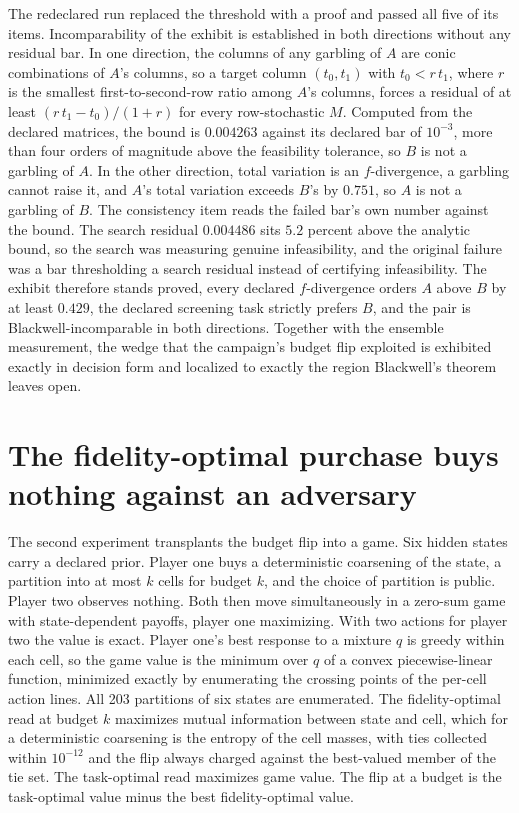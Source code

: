 \documentclass[aps,pre,reprint,nofootinbib]{revtex4-2}
\begin{document}
The redeclared run replaced the threshold with a proof and passed all
five of its items.  Incomparability of the exhibit is established in
both directions without any residual bar.  In one direction, the
columns of any garbling of $A$ are conic
combinations of $A$'s columns, so a target column $(t_0, t_1)$
with $t_0 < r\, t_1$, where $r$ is the smallest first-to-second-row
ratio among $A$'s columns, forces a residual of at least
$(r\, t_1 - t_0)/(1+r)$ for every row-stochastic $M$.  Computed from
the declared matrices, the bound is $0.004263$ against its declared
bar of $10^{-3}$, more than four orders of magnitude above the
feasibility tolerance, so $B$ is not a garbling of $A$.  In the other
direction, total variation is an $f$-divergence, a garbling cannot
raise it, and $A$'s total variation exceeds $B$'s by $0.751$, so $A$
is not a garbling of $B$.  The consistency item reads the failed
bar's own number against the bound.  The search residual $0.004486$
sits $5.2$ percent above the analytic bound, so the search
was measuring genuine infeasibility, and the original failure was a
bar thresholding a search residual instead of certifying
infeasibility.  The exhibit therefore stands proved, every declared
$f$-divergence orders $A$ above $B$ by at least $0.429$, the declared
screening task strictly prefers $B$, and the pair is
Blackwell-incomparable in both directions.  Together with the
ensemble measurement, the wedge that the campaign's budget flip
exploited is exhibited exactly in decision form and localized to
exactly the region Blackwell's theorem leaves open.

\section{The fidelity-optimal purchase buys nothing against an
adversary}
\label{sec:gd2}

The second experiment transplants the budget flip into a game.  Six
hidden states carry a declared prior.  Player one buys a
deterministic coarsening of the state, a partition into at most $k$
cells for budget $k$, and the choice of partition is public.  Player
two observes nothing.  Both then move simultaneously in a zero-sum
game with state-dependent payoffs, player one maximizing.  With two
actions for player two the value is exact.  Player one's best
response to a mixture $q$ is greedy within each cell, so the game
value is the minimum over $q$ of a convex piecewise-linear function,
minimized exactly by enumerating the crossing points of the per-cell
action lines.  All 203 partitions of six states are enumerated.  The
fidelity-optimal read at budget $k$ maximizes mutual information
between state and cell, which for a deterministic coarsening is the
entropy of the cell masses, with ties collected within $10^{-12}$ and
the flip always charged against the best-valued member of the tie
set.  The task-optimal read maximizes game value.  The flip at a
budget is the task-optimal value minus the best fidelity-optimal
value.
\end{document}
